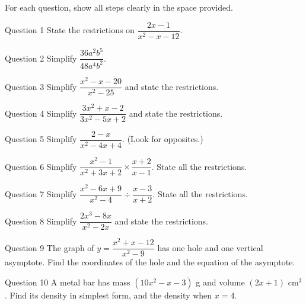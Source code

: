\documentclass[11pt]{article}
\begin{document}
\clearpage
{}
For each question, show all steps clearly in the space provided.

\begin{qbox}{Question 1}
State the restrictions on $\dfrac{2x - 1}{x^2 - x - 12}$.\workspace{1.8cm}
\end{qbox}

\begin{qbox}{Question 2}
Simplify $\dfrac{36a^2b^5}{48a^4b^2}$.\workspace{2cm}
\end{qbox}

\begin{qbox}{Question 3}
Simplify $\dfrac{x^2 - x - 20}{x^2 - 25}$ and state the restrictions.\workspace{3cm}
\end{qbox}

\begin{qbox}{Question 4}
Simplify $\dfrac{3x^2 + x - 2}{3x^2 - 5x + 2}$ and state the restrictions.\workspace{3.4cm}
\end{qbox}

\begin{qbox}{Question 5}
Simplify $\dfrac{2-x}{x^2-4x+4}$. (Look for opposites.)\workspace{3cm}
\end{qbox}

\begin{qbox}{Question 6}
Simplify $\dfrac{x^2 - 1}{x^2 + 3x + 2}\times\dfrac{x + 2}{x - 1}$. State all the restrictions.\workspace{3.6cm}
\end{qbox}

\begin{qbox}{Question 7}
Simplify $\dfrac{x^2 - 6x + 9}{x^2 - 4}\div\dfrac{x - 3}{x + 2}$. State all the restrictions.\workspace{3.8cm}
\end{qbox}

\begin{qbox}{Question 8}
Simplify $\dfrac{2x^3 - 8x}{x^2 - 2x}$ and state the restrictions.\workspace{3.2cm}
\end{qbox}

\begin{qbox}{Question 9}
The graph of $y=\dfrac{x^2+x-12}{x^2-9}$ has one hole and one vertical asymptote. Find the coordinates of the hole and the equation of the asymptote.\workspace{3.8cm}
\end{qbox}

\begin{qbox}{Question 10}
A metal bar has mass $(10x^2-x-3)$ g and volume $(2x+1)$ cm$^3$. Find its density in simplest form, and the density when $x=4$.\workspace{3.2cm}
\end{qbox}
\end{document}
